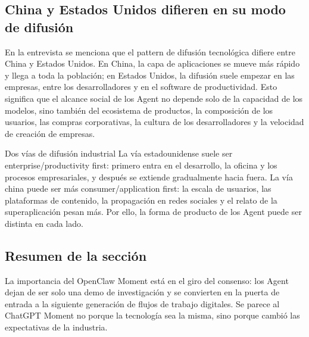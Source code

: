 \subsection{China y Estados Unidos difieren en su modo de difusión}

En la entrevista se menciona que el pattern de difusión tecnológica difiere entre China y Estados Unidos. En China, la capa de aplicaciones se mueve más rápido y llega a toda la población; en Estados Unidos, la difusión suele empezar en las empresas, entre los desarrolladores y en el software de productividad. Esto significa que el alcance social de los Agent no depende solo de la capacidad de los modelos, sino también del ecosistema de productos, la composición de los usuarios, las compras corporativas, la cultura de los desarrolladores y la velocidad de creación de empresas.

\begin{knowledgebox}{Dos vías de difusión industrial}
La vía estadounidense suele ser enterprise/productivity first: primero entra en el desarrollo, la oficina y los procesos empresariales, y después se extiende gradualmente hacia fuera. La vía china puede ser más consumer/application first: la escala de usuarios, las plataformas de contenido, la propagación en redes sociales y el relato de la superaplicación pesan más. Por ello, la forma de producto de los Agent puede ser distinta en cada lado.
\end{knowledgebox}

\subsection{Resumen de la sección}

La importancia del OpenClaw Moment está en el giro del consenso: los Agent dejan de ser solo una demo de investigación y se convierten en la puerta de entrada a la siguiente generación de flujos de trabajo digitales. Se parece al ChatGPT Moment no porque la tecnología sea la misma, sino porque cambió las expectativas de la industria.
